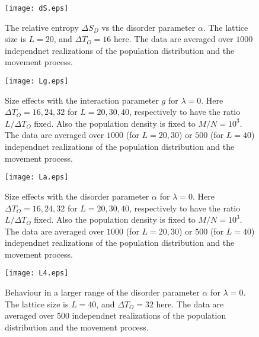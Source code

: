 \documentclass[aps,preprint]{revtex4-1}
\begin{document}
\begin{figure}
\texttt{[image: dS.eps]} 
\caption{The relative entropy $\Delta S_D$ vs the disorder parameter $\alpha$. The lattice size is $L=20$, and $\Delta T_O=16$ here. The data are averaged over $1000$ independnet realizations of the population distribution and the movement process.}\label{dS}
\end{figure}



\begin{figure}
\texttt{[image: Lg.eps]} 
\caption{Size effects with the interaction parameter $g$ for $\lambda=0$. Here $\Delta T_O=16, 24, 32$ for $L=20, 30, 40$, respectively to have the ratio $L/\Delta T_O$ fixed. Also the population density is fixed to $M/N=10^3$. The data are averaged over $1000$ (for $L=20,30$) or $500$ (for $L=40$) independnet realizations of the population distribution and the movement process.}\label{Lg}
\end{figure}


\begin{figure}
\texttt{[image: La.eps]} 
\caption{Size effects with the disorder parameter $\alpha$ for $\lambda=0$. Here $\Delta T_O=16, 24, 32$ for $L=20, 30, 40$, respectively to have the ratio $L/\Delta T_O$ fixed. Also the population density is fixed to $M/N=10^3$. The data are averaged over $1000$ (for $L=20,30$) or $500$ (for $L=40$) independnet realizations of the population distribution and the movement process.}\label{La}
\end{figure}


\begin{figure}
\texttt{[image: L4.eps]} 
\caption{Behaviour in a larger range of the disorder parameter $\alpha$ for $\lambda=0$. The lattice size is $L=40$, and $\Delta T_O=32$ here. The data are averaged over $500$ independnet realizations of the population distribution and the movement process.}\label{L4}
\end{figure}
\end{document}
